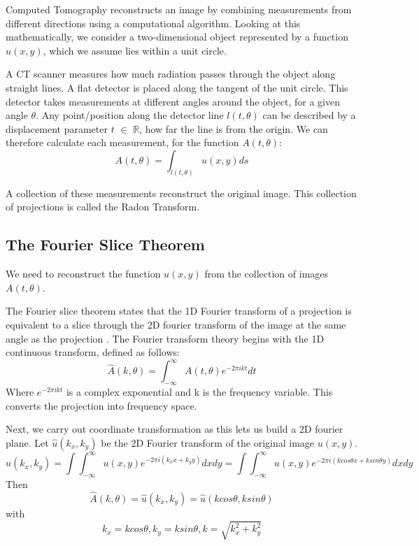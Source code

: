 \documentclass{article}
\begin{document}
Computed Tomography reconstructs an image by combining measurements from different directions using a computational algorithm. Looking at this mathematically, we consider a two-dimensional object represented by a function $u(x,y)$, which we assume lies within a unit circle.

A CT scanner measures how much radiation passes through the object along straight lines. A flat detector is placed along the tangent of the unit circle. This detector takes measurements at different angles around the object, for a given angle $\theta$. Any point/position along the detector line $l(t, \theta)$ can be described by a displacement parameter $t$ $\in$ $\mathbb{R}$, how far the line is from the origin. We can therefore calculate each measurement, for the function $A(t, \theta)$: \cite{Chapter8_ct}
\[A(t, \theta) = \int_{l(t,\theta)} u(x,y) ds \]

A collection of these measurements reconstruct the original image. This collection of projections is called the Radon Transform.

\subsection{The Fourier Slice Theorem} \label{sec:fourier_slice}

We need to reconstruct the function $u(x,y)$ from the collection of images $A(t, \theta)$. 

The Fourier slice theorem states that the 1D Fourier transform of a projection is equivalent to a slice through the 2D fourier transform of the image at the same angle as the projection \cite{fourierslice}. The Fourier transform theory begins with the 1D continuous transform, defined as follows:
\[\hat{A}(k, \theta) = \int_{-\infty}^{\infty} A(t, \theta) e^{-2\pi ikt}dt\]
Where $e^{-2\pi ikt}$ is a complex exponential and k is the frequency variable. This converts the projection into frequency space.

Next, we carry out coordinate transformation as this lets us build a 2D fourier plane. Let $\hat{u}(k_{x}, k_{y})$ be the 2D Fourier transform of the original image $u(x,y)$. 
\[\hat{u}(k_{x}, k_{y}) = \int \int^{\infty}_{-\infty} u(x,y) e^{-2\pi i(k_{x}x + k_{y}y)}dxdy = \int \int^{\infty}_{-\infty} u(x,y) e^{-2\pi i(kcos\theta x + ksin\theta y)}dxdy \]
Then
\[\hat{A}(k, \theta) = \hat{u}(k_{x}, k_{y}) = \hat{u}(kcos\theta , ksin\theta)\]
with 
\[k_{x} = kcos\theta, k_{y} = ksin\theta, k = \sqrt{k_{x}^{2} + k_{y}^{2}}\]
\end{document}
